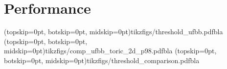 \section{Performance}\label{sec:performance}


\Figure[htb](topskip=0pt, botskip=0pt, midskip=0pt){tikzfigs/threshold_ufbb.pdf}{bla\label{threshold_ufbb}}
\Figure[htb](topskip=0pt, botskip=0pt, midskip=0pt){tikzfigs/comp_ufbb_toric_2d_p98.pdf}{bla\label{tmw_comp}}
\Figure[htb](topskip=0pt, botskip=0pt, midskip=0pt){tikzfigs/threshold_comparison.pdf}{bla\label{thres_comp}}
